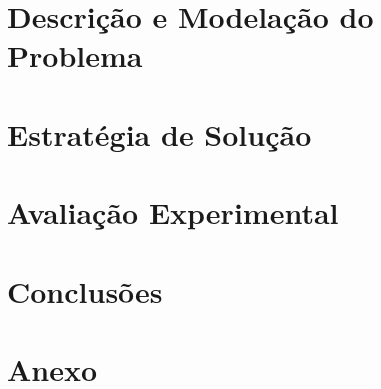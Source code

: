 \documentclass[12pt,a4paper]{article}
\begin{document}
\section{Descrição e Modelação do Problema}

\section{Estratégia de Solução}

\section{Avaliação Experimental}

\section{Conclusões}

\clearpage

\section*{Anexo}
\end{document}
